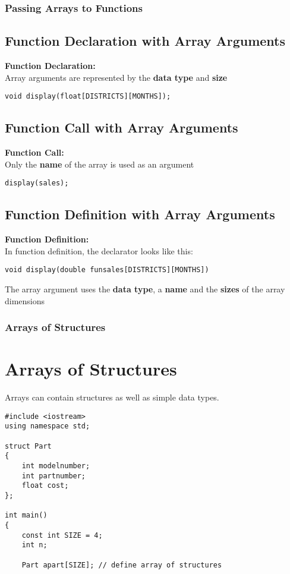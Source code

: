 \documentclass{beamer}
\begin{document}
\begin{frame}\frametitle{Passing Arrays to Functions}
    \subsection{Function Declaration with Array Arguments} %
    \label{sub:function_declaration_with_array_arguments}
    \textbf{Function Declaration:} \\
    Array arguments are represented by the \textbf{data type} and \textbf{size}
    \begin{center}
        \texttt{void display(float[DISTRICTS][MONTHS]);}
    \end{center}

    \subsection{Function Call with Array Arguments} %
    \label{sub:function_call_with_array_arguments}
    \textbf{Function Call:} \\
    Only the \textbf{name} of the array is used as an argument
    \begin{center}
        \texttt{display(sales);}
    \end{center}

    \subsection{Function Definition with Array Arguments} %
    \label{sub:function_definition_with_array_arguments}
    \textbf{Function Definition:} \\
    In function definition, the declarator looks like this:
    \begin{center}
        \texttt{void display(double funsales[DISTRICTS][MONTHS])}
    \end{center}
    The array argument uses the \textbf{data type}, a \textbf{name} and the \textbf{sizes} of the array dimensions
\end{frame}

\begin{frame}[fragile]\frametitle{Arrays of Structures}
    \section{Arrays of Structures} %
    \label{sec:arrays_of_structures}
    Arrays can contain structures as well as simple data types.
    \lstset{style=mystyle}
\begin{lstlisting}
#include <iostream>
using namespace std;

struct Part
{
    int modelnumber;
    int partnumber;
    float cost;
};

int main()
{
    const int SIZE = 4;
    int n;

    Part apart[SIZE]; // define array of structures
\end{lstlisting}
\end{frame}
\end{document}
